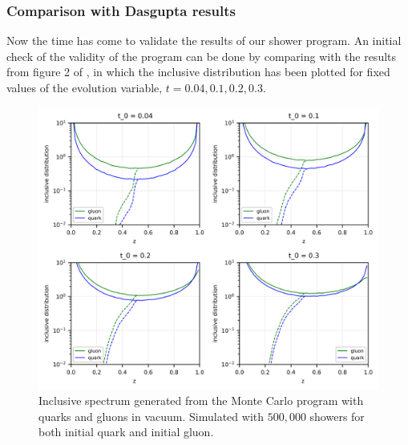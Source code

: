 \documentclass[main.tex]{subfiles}
\begin{document}
\subsubsection{Comparison with Dasgupta results}
Now the time has come to validate the results of our shower program. An initial check of the validity of the program can be done by comparing with the results from figure 2 of \cite{Dasgupta_2015}, in which the inclusive distribution has been plotted for fixed values of the evolution variable, \( t = 0.04, 0.1, 0.2, 0.3\).
\begin{figure}[ht]
    \centering
    \includegraphics[width=12cm]{pictures/distributions/vacuum_quarkgluon_dasgupta_500k_minz_incldist.png}
    \caption{Inclusive spectrum generated from the Monte Carlo program with quarks and gluons in vacuum. Simulated with \(500,000\) showers for both initial quark and initial gluon. }
    \label{fig: vacuum_distribution_quark_and_gluon}
\end{figure}
\end{document}
